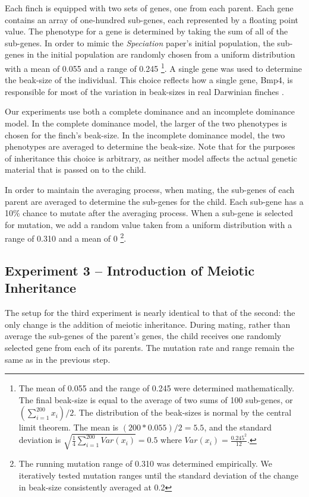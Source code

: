 \documentclass{article}
\begin{document}
Each finch is equipped with two sets of genes, one from each parent. Each gene contains an array of one-hundred sub-genes, each represented by a floating point value. The phenotype for a gene is determined by taking the sum of all of the sub-genes. In order to mimic the \textit{Speciation} paper’s initial population, the sub-genes in the initial population are randomly chosen from a uniform distribution with a mean of 0.055 and a range of 0.245 \footnote{The mean of 0.055 and the range of 0.245 were determined mathematically. The final beak-size is equal to the average of two sums of 100 sub-genes, or $(\sum_{i=1}^{200} x_{i})/2$. The distribution of the beak-sizes is normal by the central limit theorem. The mean is $(200 * 0.055)/2 = 5.5$, and the standard deviation is $\sqrt{\frac{1}{4}\sum_{i=1}^{200}Var(x_{i})} = 0.5$ where $Var(x_{i}) = \frac{0.245^2}{12}$.}. A single gene was used to determine the beak-size of the individual. This choice reflects how a single gene, Bmp4, is responsible for most of the variation in beak-sizes in real Darwinian finches \cite{BMP4}. 

Our experiments use both a complete dominance and an incomplete dominance model. In the complete dominance model, the larger of the two phenotypes is chosen for the finch's beak-size. In the incomplete dominance model, the two phenotypes are averaged to determine the beak-size. Note that for the purposes of inheritance this choice is arbitrary, as neither model affects the actual genetic material that is passed on to the child. 

In order to maintain the averaging process, when mating, the sub-genes of each parent are averaged to determine the sub-genes for the child. Each sub-gene has a 10\% chance to mutate after the averaging process. When a sub-gene is selected for mutation, we add a random value taken from a uniform distribution with a range of 0.310 and a mean of 0 \footnote{The running mutation range of 0.310 was determined empirically. We iteratively tested mutation ranges until the standard deviation of the change in beak-size consistently averaged at 0.2}.


	
\subsection{Experiment 3 -- Introduction of Meiotic
Inheritance}

The setup for the third experiment is nearly identical to that of the second: the only change is the addition of meiotic inheritance. During mating, rather than average the sub-genes of the parent's genes, the child receives one randomly selected gene from each of its parents. The mutation rate and range remain the same as in the previous step. 
\end{document}
